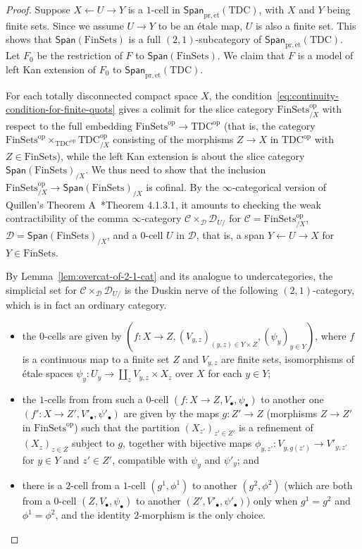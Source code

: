 \documentclass[a4paper,reqno]{amsart}
\theoremstyle{plain}
\theoremstyle{definition}
\theoremstyle{remark}
\numberwithin{equation}{section}
\newcommand{\cC}{\mathcal{C}}
\newcommand{\cD}{\mathcal{D}}
\newcommand{\Span}{\mathsf{Span}}
\newcommand{\FinSets}{\mathrm{FinSets}}
\newcommand{\opo}{\mathrm{op}}
\newcommand{\pret}{\mathrm{pr,\acute{e}t}}
\newcommand{\TDC}{\mathrm{TDC}}
\begin{document}
\begin{proof}
Suppose $X \leftarrow U \to Y$ is a $1$-cell in $\Span_{\pret}(\TDC)$, with $X$ and $Y$ being finite sets.
Since we assume $U \to Y$ to be an étale map, $U$ is also a finite set.
This shows that $\Span(\FinSets)$ is a full $(2,1)$-subcategory of $\Span_{\pret}(\TDC)$.
Let $F_{0}$ be the restriction of $F$ to $\Span(\FinSets)$.
We claim that $F$ is a model of left Kan extension of $F_0$ to $\Span_{\pret}(\TDC)$.

For each totally disconnected compact space $X$, the condition~\eqref{eq:continuity-condition-for-finite-quots} gives a colimit for the slice category $\FinSets^\opo_{/X}$ with respect to the full embedding $\FinSets^\opo \to \TDC^\opo$ (that is, the category $\FinSets^\opo \times_{\TDC^\opo} \TDC^\opo_{/X}$ consisting of the morphisms $Z \to X$ in $\TDC^\opo$ with $Z \in \FinSets$), while the left Kan extension is about the slice category $\Span(\FinSets)_{/X}$.
We thus need to show that the inclusion $\FinSets^\opo_{/X} \to \Span(\FinSets)_{/X}$ is cofinal.
By the $\infty$-categorical version of Quillen's Theorem A~\cite{lur:ht}*{Theorem 4.1.3.1}, it amounts to checking the weak contractibility of the comma $\infty$-category $\cC \times_\cD \cD_{U/}$ for $\cC = \FinSets^\opo_{/X}$, $\cD = \Span(\FinSets)_{/X}$, and a $0$-cell $U$ in $\cD$, that is, a span $Y \leftarrow U \to X$ for $Y \in \FinSets$.

By Lemma~\ref{lem:overcat-of-2-1-cat} and its analogue to undercategories, the simplicial set for $\cC \times_\cD \cD_{U /}$ is the Duskin nerve of the following $(2,1)$-category, which is in fact an ordinary category.
\begin{itemize}
\item the $0$-cells are given by $(f \colon X \to Z, (V_{y, z})_{(y, z) \in Y \times Z}, (\psi_y)_{y \in Y})$, where $f$ is a continuous map to a finite set $Z$ and $V_{y, z}$ are finite sets, isomorphisms of étale spaces $\psi_y\colon U_y \to \coprod_z V_{y, z} \times X_z$ over $X$ for each $y \in Y$;
\item the $1$-cells from from such a $0$-cell $(f \colon X \to Z, V_\bullet, \psi_\bullet)$ to another one $(f'\colon X \to Z', V'_\bullet, \psi'_\bullet)$ are given by the maps $g \colon Z' \to Z$ (morphisms $Z \to Z'$ in $\FinSets^\opo$) such that the partition $(X_{z'})_{z' \in Z'}$ is a refinement of $(X_z)_{z \in Z}$ subject to $g$, together with bijective maps $\phi_{y,z'} \colon V_{y,g(z')} \to V'_{y,z'}$ for $y \in Y$ and $z' \in Z'$, compatible with $\psi_y$ and $\psi'_y$; and
\item there is a $2$-cell from a $1$-cell $(g^1, \phi^1)$ to another $(g^2, \phi^2)$ (which are both from a $0$-cell $(Z, V_{\bullet}, \psi_\bullet)$ to another $(Z', V'_\bullet, \psi'_\bullet)$) only when $g^1 = g^2$ and $\phi^1 = \phi^2$, and the identity $2$-morphism is the only choice.
\end{itemize}


\end{proof}
\end{document}
